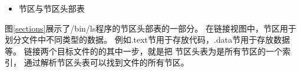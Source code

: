 \begin{itemize}
  \item 节区与节区头部表
\end{itemize}

图\ref{sections}展示了/bin/ls程序的节区头部表的一部分。
在链接视图中，节区用于划分文件中不同类型的数据。
例如.text节用于存放代码，.data节用于存放数据等。
链接两个目标文件的的其中一步，就是把
节区头表为是所有节区的一个索引，
通过解析节区头表可以找到文件的所有节区。

